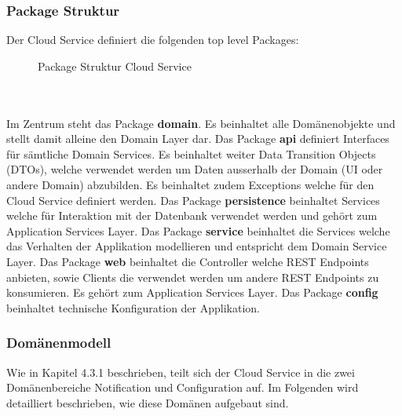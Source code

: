 \clearpage

\subsubsection*{Package Struktur}

Der Cloud Service definiert die folgenden top level Packages:

\begin{figure}[h]
    \centering
    \begin{minipage}[b]{0.7\textwidth}

    \caption{Package Struktur Cloud Service}\label{fig:packagescloudservice}
    \end{minipage}
\end{figure}

\\ \\

Im Zentrum steht das Package \textbf{domain}.
Es beinhaltet alle Domänenobjekte und stellt damit alleine den Domain Layer dar.
Das Package \textbf{api} definiert Interfaces für sämtliche Domain Services.
Es beinhaltet weiter Data Transition Objects (DTOs), welche verwendet werden um Daten ausserhalb der Domain (UI oder andere Domain) abzubilden.
Es beinhaltet zudem Exceptions welche für den Cloud Service definiert werden.
Das Package \textbf{persistence} beinhaltet Services welche für Interaktion mit der Datenbank verwendet werden und  gehört zum Application Services Layer.
Das Package \textbf{service} beinhaltet die Services welche das Verhalten der Applikation modellieren und entspricht dem Domain Service Layer.
Das Package \textbf{web} beinhaltet die Controller welche REST Endpoints anbieten, sowie Clients die verwendet werden um andere REST Endpoints zu konsumieren.
Es gehört zum Application Services Layer.
Das Package \textbf{config} beinhaltet technische Konfiguration der Applikation.


\clearpage

\subsubsection{Domänenmodell}

Wie in Kapitel 4.3.1 beschrieben, teilt sich der Cloud Service in die zwei Domänenbereiche Notification und Configuration auf.
Im Folgenden wird detailliert beschrieben, wie diese Domänen aufgebaut sind.

